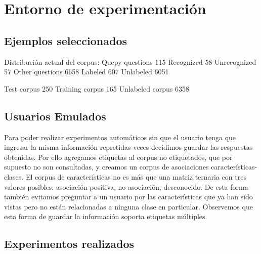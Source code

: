 \chapter{Entorno de experimentación}

\section{Ejemplos seleccionados}


Distribución actual del corpus:
Quepy questions 115
	Recognized 58
	Unrecognized 57
Other questions 6658
	Labeled 607
    Unlabeled 6051

Test corpus 250
Training corpus 165
Unlabeled corpus 6358

\section{Usuarios Emulados}

Para poder realizar experimentos automáticos sin que el usuario tenga que ingresar la misma información repretidas veces decidimos guardar las respuestas obtenidas. Por ello agregamos etiquetas al corpus no etiquetados, que por supuesto no son consultadas, y creamos un corpus de asociaciones características-clases.
El corpus de características no es más que una matriz ternaria con tres valores posibles: asociación positiva, no asociación, desconocido. De esta forma también evitamos preguntar a un usuario por las características que ya han sido vistas pero no están relacionadas a ninguna clase en particular. Observemos que esta forma de guardar la información soporta etiquetas múltiples.

\section{Experimentos realizados}



